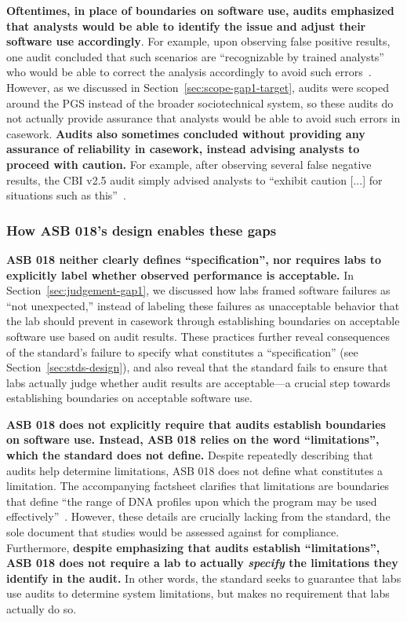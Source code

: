 \textbf{Oftentimes, in place of boundaries on software use, audits emphasized that analysts would be able to identify the issue and adjust their software use accordingly}. For example, upon observing false positive results, one audit concluded that such scenarios are ``recognizable by trained analysts'' who would be able to correct the analysis accordingly to avoid such errors~\cite[p.8]{ocmeIV2.7}. However, as we discussed in Section~\ref{sec:scope-gap1-target}, audits were scoped around the PGS instead of the broader sociotechnical system, so these audits do not actually provide assurance that analysts would be able to avoid such errors in casework. \textbf{Audits also sometimes concluded without providing any assurance of reliability in casework, instead advising analysts to proceed with caution.} For example, after observing several false negative results, the CBI v2.5 audit simply advised analysts to ``exhibit caution [...] for situations such as this''~\cite[p.31]{cbiIV}. 

\subsubsection{How ASB 018's design enables these gaps}
\label{sec:judgement-design}
\textbf{ASB 018 neither clearly defines ``specification'', nor requires labs to explicitly label whether observed performance is acceptable.} In Section~\ref{sec:judgement-gap1}, we discussed how labs framed software failures as ``not unexpected,'' instead of labeling these failures as unacceptable behavior that the lab should prevent in casework through establishing boundaries on acceptable software use based on audit results. These practices further reveal consequences of the standard's failure to specify what constitutes a ``specification'' (see Section~\ref{sec:stds-design}), and also reveal that the standard fails to ensure that labs actually judge whether audit results are acceptable---a crucial step towards establishing boundaries on acceptable software use.


\textbf{ASB 018 does not explicitly require that audits establish boundaries on software use. Instead, ASB 018 relies on the word ``limitations'', which the standard does not define.} Despite repeatedly describing that audits help determine limitations, ASB 018 does not define what constitutes a limitation. The accompanying factsheet clarifies that limitations are boundaries that define ``the range of DNA profiles upon which the program may be used effectively''~\cite{asb018factsheet}. However, these details are crucially lacking from the standard, the sole document that studies would be assessed against for compliance. Furthermore, \textbf{despite emphasizing that audits establish ``limitations'', ASB 018 does not require a lab to actually \textit{specify} the limitations they identify in the audit.} In other words, the standard seeks to guarantee that labs use audits to determine system limitations, but makes no requirement that labs actually do so. 





